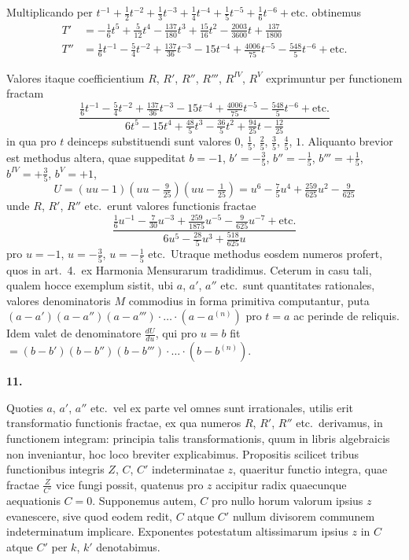 \documentclass[12pt,a4paper]{article}
\newcommand{\art}[1]{\par\medskip\noindent\textbf{#1.}\par\nopagebreak\smallskip}
\begin{document}
Multiplicando per $t^{-1} + \frac{1}{2}t^{-2} + \frac{1}{3}t^{-3} + \frac{1}{4}t^{-4} + \frac{1}{5}t^{-5} + \frac{1}{6}t^{-6} + \text{etc.}$ obtinemus
\begin{align*}
T' &= -\tfrac{1}{6}t^5 + \tfrac{5}{12}t^4 - \tfrac{137}{180}t^3 + \tfrac{15}{16}t^2 - \tfrac{2003}{3600}t + \tfrac{137}{1800}\\
T'' &= \tfrac{1}{6}t^{-1} - \tfrac{5}{4}t^{-2} + \tfrac{137}{36}t^{-3} - 15t^{-4} + \tfrac{4006}{75}t^{-5} - \tfrac{548}{5}t^{-6} + \text{etc.}
\end{align*}

Valores itaque coefficientium $R$, $R'$, $R''$, $R'''$, $R^{IV}$, $R^{V}$ exprimuntur per functionem fractam
\[
\frac{\frac{1}{6}t^{-1} - \frac{5}{4}t^{-2} + \frac{137}{36}t^{-3} - 15t^{-4} + \frac{4006}{75}t^{-5} - \frac{548}{5}t^{-6} + \text{etc.}}{6t^5 - 15t^4 + \frac{48}{5}t^3 - \frac{36}{5}t^2 + \frac{94}{25}t - \frac{12}{25}}
\]
in qua pro $t$ deinceps substituendi sunt valores $0$, $\frac{1}{5}$, $\frac{2}{5}$, $\frac{3}{5}$, $\frac{4}{5}$, $1$. Aliquanto brevior est methodus altera, quae suppeditat $b=-1$, $b'=-\frac{3}{5}$, $b''=-\frac{1}{5}$, $b'''=+\frac{1}{5}$, $b^{IV}=+\frac{3}{5}$, $b^{V}=+1$,
\[
U = (uu-1)(uu-\tfrac{9}{25})(uu-\tfrac{1}{25}) = u^6 - \tfrac{7}{5}u^4 + \tfrac{259}{625}u^2 - \tfrac{9}{625}
\]
unde $R$, $R'$, $R''$ etc.\ erunt valores functionis fractae
\[
\frac{\frac{1}{6}u^{-1} - \frac{7}{30}u^{-3} + \frac{259}{1875}u^{-5} - \frac{9}{625}u^{-7} + \text{etc.}}{6u^5 - \frac{28}{5}u^3 + \frac{518}{625}u}
\]
pro $u=-1$, $u=-\frac{3}{5}$, $u=-\frac{1}{5}$ etc.\ Utraque methodus eosdem numeros profert, quos in art.\ 4.\ ex Harmonia Mensurarum tradidimus. Ceterum in casu tali, qualem hocce exemplum sistit, ubi $a$, $a'$, $a''$ etc.\ sunt quantitates rationales, valores denominatoris $M$ commodius in forma primitiva computantur, puta $(a-a')(a-a'')(a-a''')\cdot\ldots\cdot(a-a^{(n)})$ pro $t=a$ ac perinde de reliquis. Idem valet de denominatore $\frac{dU}{du}$, qui pro $u=b$ fit $=(b-b')(b-b'')(b-b''')\cdot\ldots\cdot(b-b^{(n)})$.

\art{11}

Quoties $a$, $a'$, $a''$ etc.\ vel ex parte vel omnes sunt irrationales, utilis erit transformatio functionis fractae, ex qua numeros $R$, $R'$, $R''$ etc.\ derivamus, in functionem integram: principia talis transformationis, quum in libris algebraicis non inveniantur, hoc loco breviter explicabimus. Propositis scilicet tribus functionibus integris $Z$, $C$, $C'$ indeterminatae $z$, quaeritur functio integra, quae fractae $\frac{Z}{C'}$ vice fungi possit, quatenus pro $z$ accipitur radix quaecunque aequationis $C=0$. Supponemus autem, $C$ pro nullo horum valorum ipsius $z$ evanescere, sive quod eodem redit, $C$ atque $C'$ nullum divisorem communem indeterminatum implicare. Exponentes potestatum altissimarum ipsius $z$ in $C$ atque $C'$ per $k$, $k'$ denotabimus.
\end{document}
